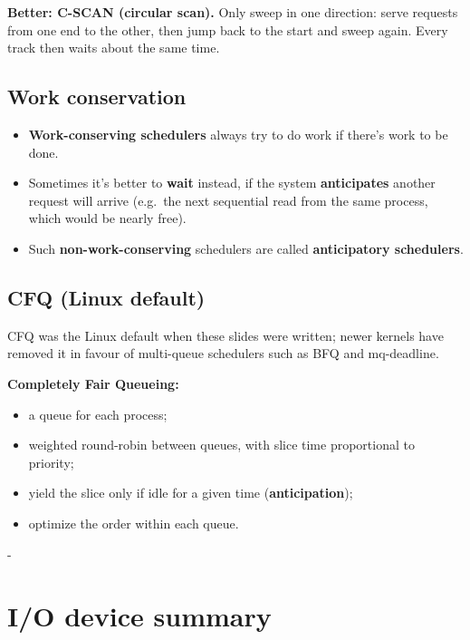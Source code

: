 \documentclass[11pt,a4paper]{article}
\makeatletter
\newcommand{\keepspace}[1]{\par\penalty-100\begingroup
  \setlength{\dimen@}{#1}\dimen@ii\pagegoal\advance\dimen@ii-\pagetotal
  \ifdim\dimen@>\dimen@ii\ifdim\dimen@ii>\z@\vfil\fi\break\fi\endgroup}
\makeatother
\begin{document}
\textbf{Better: C-SCAN (circular scan).} Only sweep in one direction: serve
requests from one end to the other, then jump back to the start and sweep
again. Every track then waits about the same time.

\subsection{Work conservation}

\begin{itemize}
  \item \textbf{Work-conserving schedulers} always try to do work if there's
        work to be done.
  \item Sometimes it's better to \textbf{wait} instead, if the system
        \textbf{anticipates} another request will arrive (e.g.\ the next
        sequential read from the same process, which would be nearly free).
  \item Such \textbf{non-work-conserving} schedulers are called
        \textbf{anticipatory schedulers}.
\end{itemize}

\subsection{CFQ (Linux default)}

CFQ was the Linux default when these slides were written; newer kernels have
removed it in favour of multi-queue schedulers such as BFQ and mq-deadline.

\textbf{Completely Fair Queueing:}
\begin{itemize}
  \item a queue for each process;
  \item weighted round-robin between queues, with slice time proportional to
        priority;
  \item yield the slice only if idle for a given time (\textbf{anticipation});
  \item optimize the order within each queue.
\end{itemize}

\keepspace{20\baselineskip}
\section{I/O device summary}
\end{document}

